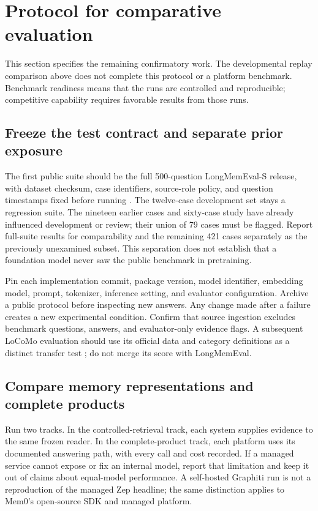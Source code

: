 \section{Protocol for comparative evaluation}
\label{sec:protocol}
This section specifies the remaining confirmatory work. The developmental replay comparison above does not complete this protocol or a platform benchmark. Benchmark readiness means that the runs are controlled and reproducible; competitive capability requires favorable results from those runs.

\subsection{Freeze the test contract and separate prior exposure}
The first public suite should be the full 500-question LongMemEval-S release, with dataset checksum, case identifiers, source-role policy, and question timestamps fixed before running \citep{longmem,longmemrepo}. The twelve-case development set stays a regression suite. The nineteen earlier cases and sixty-case study have already influenced development or review; their union of 79 cases must be flagged. Report full-suite results for comparability and the remaining 421 cases separately as the previously unexamined subset. This separation does not establish that a foundation model never saw the public benchmark in pretraining.

Pin each implementation commit, package version, model identifier, embedding model, prompt, tokenizer, inference setting, and evaluator configuration. Archive a public protocol before inspecting new answers. Any change made after a failure creates a new experimental condition. Confirm that source ingestion excludes benchmark questions, answers, and evaluator-only evidence flags. A subsequent LoCoMo evaluation should use its official data and category definitions as a distinct transfer test \citep{locomorepo}; do not merge its score with LongMemEval.

\subsection{Compare memory representations and complete products}
Run two tracks. In the controlled-retrieval track, each system supplies evidence to the same frozen reader. In the complete-product track, each platform uses its documented answering path, with every call and cost recorded. If a managed service cannot expose or fix an internal model, report that limitation and keep it out of claims about equal-model performance. A self-hosted Graphiti run is not a reproduction of the managed Zep headline; the same distinction applies to Mem0's open-source SDK and managed platform.

